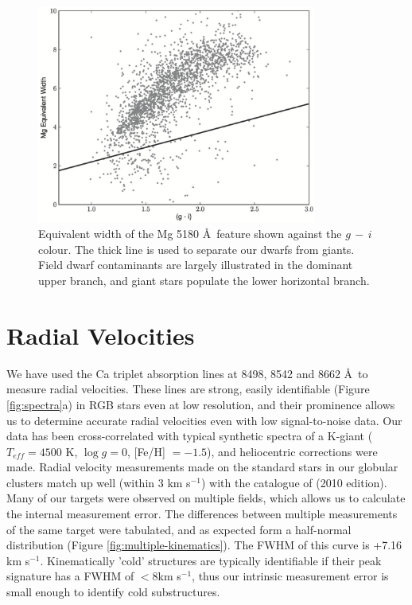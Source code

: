 \documentclass{emulateapj}
\begin{document}
	\begin{figure}[h!]
		\centering
		\includegraphics[width=9.2cm]{./figures/dwarfgiant_copy.eps}
		\caption{Equivalent width of the Mg 5180 \AA\ feature shown against the $g\,-\,i$ colour. The thick line is used to separate our dwarfs from giants. Field dwarf contaminants are largely illustrated in the dominant upper branch, and giant stars populate the lower horizontal branch.}
		\label{fig:dwarf-giant-separation}
	\end{figure}
	
	
	\section{Radial Velocities}
	\label{sec:kinematics}
	
	We have used the Ca triplet absorption lines at 8498, 8542 and 8662 \AA\, to measure radial velocities. These lines are strong, easily identifiable  (Figure \ref{fig:spectra}a) in RGB stars even at low resolution, and their prominence allows us to determine accurate radial velocities even with low signal-to-noise data. Our data has been cross-correlated with typical synthetic spectra of a K-giant ($T_{eff} = 4500$ K, $\log{g} = 0$, [Fe/H] $= -1.5$), and heliocentric corrections were made. Radial velocity measurements made on the standard stars in our globular clusters match up well (within 3 km s$^{-1}$) with the catalogue of \citet{Harris_1996} (2010 edition). Many of our targets were observed on multiple fields, which allows us to calculate the internal measurement error. The differences between multiple measurements of the same target were tabulated, and as expected form a half-normal distribution (Figure \ref{fig:multiple-kinematics}). The FWHM of this curve is +7.16 km s$^{-1}$. Kinematically 'cold' structures are typically identifiable if their peak signature has a FWHM of $< 8 $km s$^{-1}$, thus our intrinsic measurement error is small enough to identify cold substructures.
	
\end{document}
